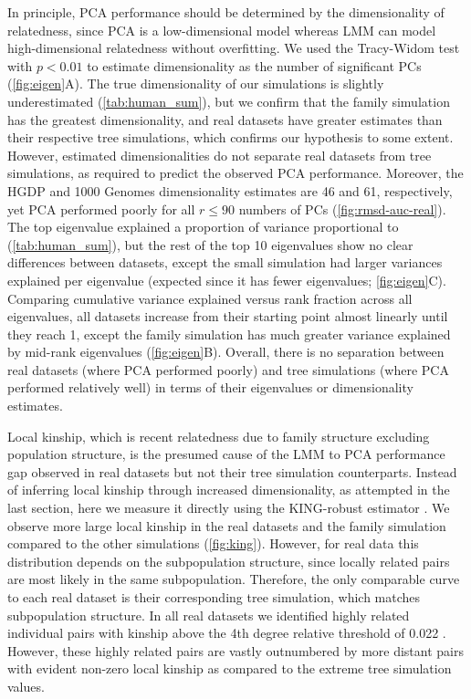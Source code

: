 \documentclass[11pt]{article}
\begin{document}
In principle, PCA performance should be determined by the dimensionality of relatedness, since PCA is a low-dimensional model whereas LMM can model high-dimensional relatedness without overfitting.
We used the Tracy-Widom test \citep{patterson_population_2006} with $p < 0.01$ to estimate dimensionality as the number of significant PCs (\cref{fig:eigen}A).
The true dimensionality of our simulations is slightly underestimated (\cref{tab:human_sum}), but we confirm that the family simulation has the greatest dimensionality, and real datasets have greater estimates than their respective tree simulations, which confirms our hypothesis to some extent.
However, estimated dimensionalities do not separate real datasets from tree simulations, as required to predict the observed PCA performance.
Moreover, the HGDP and 1000 Genomes dimensionality estimates are 46 and 61, respectively, yet PCA performed poorly for all $r \le 90$ numbers of PCs (\cref{fig:rmsd-auc-real}).
The top eigenvalue explained a proportion of variance proportional to \Fst (\cref{tab:human_sum}), but the rest of the top 10 eigenvalues show no clear differences between datasets, except the small simulation had larger variances explained per eigenvalue (expected since it has fewer eigenvalues; \cref{fig:eigen}C).
Comparing cumulative variance explained versus rank fraction across all eigenvalues, all datasets increase from their starting point almost linearly until they reach 1, except the family simulation has much greater variance explained by mid-rank eigenvalues (\cref{fig:eigen}B).
Overall, there is no separation between real datasets (where PCA performed poorly) and tree simulations (where PCA performed relatively well) in terms of their eigenvalues or dimensionality estimates.

Local kinship, which is recent relatedness due to family structure excluding population structure, is the presumed cause of the LMM to PCA performance gap observed in real datasets but not their tree simulation counterparts.
Instead of inferring local kinship through increased dimensionality, as attempted in the last section, here we measure it directly using the KING-robust estimator \citep{manichaikul_robust_2010}.
We observe more large local kinship in the real datasets and the family simulation compared to the other simulations (\cref{fig:king}).
However, for real data this distribution depends on the subpopulation structure, since locally related pairs are most likely in the same subpopulation.
Therefore, the only comparable curve to each real dataset is their corresponding tree simulation, which matches subpopulation structure.
In all real datasets we identified highly related individual pairs with kinship above the 4th degree relative threshold of 0.022 \citep{manichaikul_robust_2010, conomos_model-free_2016}.
However, these highly related pairs are vastly outnumbered by more distant pairs with evident non-zero local kinship as compared to the extreme tree simulation values.
\end{document}
